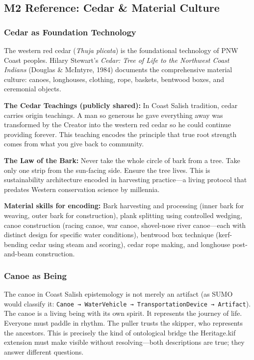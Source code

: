 \documentclass[11pt,letterpaper]{article}
\begin{document}
\subsection{M2 Reference: Cedar \& Material Culture}

\subsubsection{Cedar as Foundation Technology}

The western red cedar (\textit{Thuja plicata}) is the foundational technology of PNW Coast peoples. Hilary Stewart's \textit{Cedar: Tree of Life to the Northwest Coast Indians} (Douglas \& McIntyre, 1984) documents the comprehensive material culture: canoes, longhouses, clothing, rope, baskets, bentwood boxes, and ceremonial objects.

\textbf{The Cedar Teachings (publicly shared):} In Coast Salish tradition, cedar carries origin teachings. A man so generous he gave everything away was transformed by the Creator into the western red cedar so he could continue providing forever. This teaching encodes the principle that true root strength comes from what you give back to community.

\textbf{The Law of the Bark:} Never take the whole circle of bark from a tree. Take only one strip from the sun-facing side. Ensure the tree lives. This is sustainability architecture encoded in harvesting practice---a living protocol that predates Western conservation science by millennia.

\textbf{Material skills for encoding:} Bark harvesting and processing (inner bark for weaving, outer bark for construction), plank splitting using controlled wedging, canoe construction (racing canoe, war canoe, shovel-nose river canoe---each with distinct design for specific water conditions), bentwood box technique (kerf-bending cedar using steam and scoring), cedar rope making, and longhouse post-and-beam construction.

\subsubsection{Canoe as Being}

The canoe in Coast Salish epistemology is not merely an artifact (as SUMO would classify it: \texttt{Canoe → WaterVehicle → TransportationDevice → Artifact}). The canoe is a living being with its own spirit. It represents the journey of life. Everyone must paddle in rhythm. The puller trusts the skipper, who represents the ancestors. This is precisely the kind of ontological bridge the Heritage.kif extension must make visible without resolving---both descriptions are true; they answer different questions.
\end{document}
